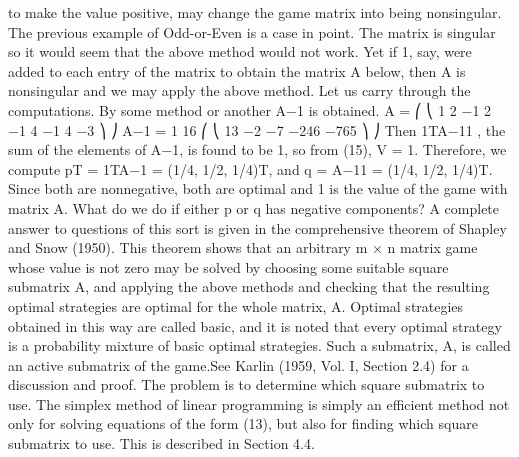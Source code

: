 to make the value positive, may change the game matrix into being nonsingular. The
previous example of Odd-or-Even is a case in point. The matrix is singular so it would
seem that the above method would not work. Yet if 1, say, were added to each entry of
the matrix to obtain the matrix A below, then A is nonsingular and we may apply the
above method. Let us carry through the computations. By some method or another A−1
is obtained.
A =
⎛
⎝
1 2 −1
2 −1 4
−1 4 −3
⎞
⎠ A−1 = 1
16
⎛
⎝
13 −2 −7
−246
−765
⎞
⎠
Then 1TA−11 , the sum of the elements of A−1, is found to be 1, so from (15), V = 1.
Therefore, we compute pT = 1TA−1 = (1/4, 1/2, 1/4)T, and q = A−11 = (1/4, 1/2, 1/4)T.
Since both are nonnegative, both are optimal and 1 is the value of the game with matrix
A.
What do we do if either p or q has negative components? A complete answer to
questions of this sort is given in the comprehensive theorem of Shapley and Snow (1950).
This theorem shows that an arbitrary m × n matrix game whose value is not zero may be
solved by choosing some suitable square submatrix A, and applying the above methods
and checking that the resulting optimal strategies are optimal for the whole matrix, A.
Optimal strategies obtained in this way are called basic, and it is noted that every optimal
strategy is a probability mixture of basic optimal strategies. Such a submatrix, A, is called
an active submatrix of the game.See Karlin (1959, Vol. I, Section 2.4) for a discussion and
proof. The problem is to determine which square submatrix to use. The simplex method
of linear programming is simply an efficient method not only for solving equations of the
form (13), but also for finding which square submatrix to use. This is described in Section
4.4.
